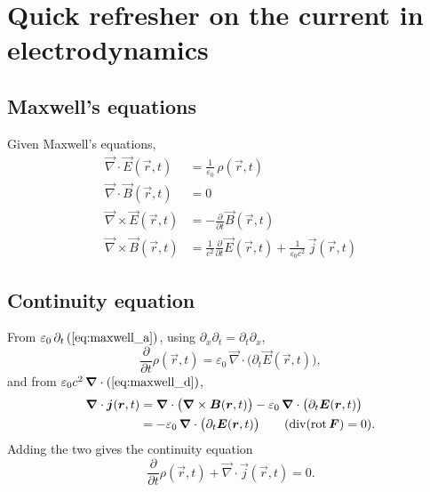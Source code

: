 \documentclass[../../../main.tex]{subfiles}
\begin{document}
\section{Quick refresher on the current in electrodynamics}
\label{sec:current-electrodynamics}

\subsection{Maxwell's equations}

Given Maxwell's equations,
\begin{align}
\vec\nabla\cdot\vec E(\vec r,t)&=\frac{1}{\varepsilon_0}\,\rho(\vec r,t) \label{eq:maxwell_a}\\
\vec\nabla\cdot\vec B(\vec r,t)&=0 \label{eq:maxwell_b}\\
\vec\nabla\times\vec E(\vec r,t)&=-\frac{\partial}{\partial t}\vec B(\vec r,t) \label{eq:maxwell_c}\\
\vec\nabla\times\vec B(\vec r,t)&=\frac{1}{c^2}\frac{\partial}{\partial t}\vec E(\vec r,t)
   +\frac{1}{\varepsilon_0 c^2}\,\vec j(\vec r,t) \label{eq:maxwell_d}
\end{align}

\subsection{Continuity equation}

From $\varepsilon_0\,\partial_t\,(\cref{eq:maxwell_a})$, using $\partial_x\partial_t=\partial_t\partial_x$,
\begin{equation}
\frac{\partial}{\partial t}\rho(\vec r,t)
=\varepsilon_0\,\vec\nabla\cdot\bigl(\partial_t\vec E(\vec r,t)\bigr),
\end{equation}
and from $\varepsilon_0 c^2\,\vec\nabla\cdot(\cref{eq:maxwell_d})$,
\begin{align}
\vec\nabla\cdot\vec j(\vec r,t)
&=\vec\nabla\cdot\bigl(\vec\nabla\times\vec B(\vec r,t)\bigr)
-\varepsilon_0\,\vec\nabla\cdot\bigl(\partial_t\vec E(\vec r,t)\bigr)\notag\\
&= -\varepsilon_0\,\vec\nabla\cdot\bigl(\partial_t\vec E(\vec r,t)\bigr) \qquad (\operatorname{div}(\operatorname{rot}\vec F)=0).
\end{align}
Adding the two gives the continuity equation
\begin{equation}
\frac{\partial}{\partial t}\rho(\vec r,t)+\vec\nabla\cdot\vec j(\vec r,t)=0.\label{eq:continuity}
\end{equation}
\end{document}
